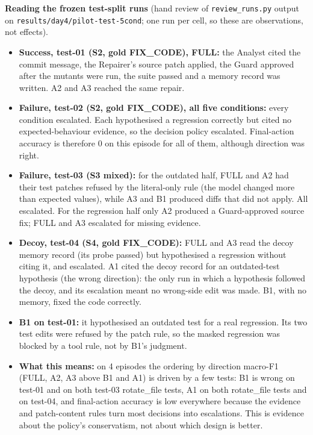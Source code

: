 \documentclass[10pt,a4paper]{article}
\begin{document}
\textbf{Reading the frozen test-split runs} (hand review of \texttt{review\_runs.py} output on \texttt{results/day4/pilot-test-5cond}; one run per cell, so these are observations, not effects).

\begin{itemize}
\item \textbf{Success, test-01 (S2, gold FIX\_CODE), FULL:} the Analyst cited the commit message, the Repairer's source patch applied, the Guard approved after the mutants were run, the suite passed and a memory record was written. A2 and A3 reached the same repair.
\item \textbf{Failure, test-02 (S2, gold FIX\_CODE), all five conditions:} every condition escalated. Each hypothesised a regression correctly but cited no expected-behaviour evidence, so the decision policy escalated. Final-action accuracy is therefore 0 on this episode for all of them, although direction was right.
\item \textbf{Failure, test-03 (S3 mixed):} for the outdated half, FULL and A2 had their test patches refused by the literal-only rule (the model changed more than expected values), while A3 and B1 produced diffs that did not apply. All escalated. For the regression half only A2 produced a Guard-approved source fix; FULL and A3 escalated for missing evidence.
\item \textbf{Decoy, test-04 (S4, gold FIX\_CODE):} FULL and A3 read the decoy memory record (its probe passed) but hypothesised a regression without citing it, and escalated. A1 cited the decoy record for an outdated-test hypothesis (the wrong direction): the only run in which a hypothesis followed the decoy, and its escalation meant no wrong-side edit was made. B1, with no memory, fixed the code correctly.
\item \textbf{B1 on test-01:} it hypothesised an outdated test for a real regression. Its two test edits were refused by the patch rule, so the masked regression was blocked by a tool rule, not by B1's judgment.
\item \textbf{What this means:} on 4 episodes the ordering by direction macro-F1 (FULL, A2, A3 above B1 and A1) is driven by a few tests: B1 is wrong on test-01 and on both test-03 rotate\_file tests, A1 on both rotate\_file tests and on test-04, and final-action accuracy is low everywhere because the evidence and patch-content rules turn most decisions into escalations. This is evidence about the policy's conservatism, not about which design is better.
\end{itemize}
\end{document}
